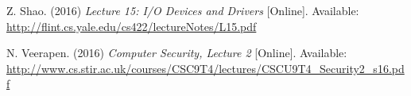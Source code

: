 \documentclass[letterpaper,10pt,onecolumn]{IEEEtran}
\begin{document}
\begin{thebibliography}{2}
Z. Shao. (2016) 
\textit{Lecture 15: I/O Devices and Drivers} 
[Online]. Available: 
\\\url{http://flint.cs.yale.edu/cs422/lectureNotes/L15.pdf}

N. Veerapen. (2016) 
\textit{Computer Security, Lecture 2} 
[Online]. Available: 
\\\url{http://www.cs.stir.ac.uk/courses/CSC9T4/lectures/CSCU9T4_Security2_s16.pdf}

\end{thebibliography}
\end{document}

